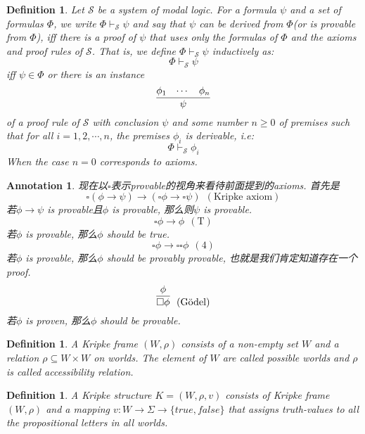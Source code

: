 \documentclass{article}
\theoremstyle{plain}
\newtheorem{definition}[theorem]{Definition}
\newtheorem{annotation}[theorem]{Annotation}
\newcounter{case}
\theoremstyle{nonumberplain}
\begin{document}
\begin{definition}
\rm Let $\mathcal{S}$ be a system of modal logic. For a formula $\psi$ and a set of formulas $\Phi$,  we write $\Phi \vdash_\mathcal{S} \psi$ and say that $\psi$ can be derived from $\Phi$(or is provable from $\Phi$), iff there is a proof of $\psi$ that uses only the formulas of $\Phi$ and the axioms and proof rules of $\mathcal{S}$. That is, we define $\Phi \vdash_\mathcal{S} \psi$ inductively as:
$$
\Phi \vdash_\mathcal{S} \psi
$$
iff $\psi \in \Phi$ or there is an instance
$$
\infer{\psi}{\phi_1 &  \cdots & \phi_n}
$$
of a proof rule of $\mathcal{S}$ with conclusion $\psi$ and some number $n \geq 0$ of premises such that for all $i=1,2,\cdots,n$, the premises $\phi_i$ is derivable, i.e:
$$
\Phi \vdash_\mathcal{S} \phi_i
$$
When the case $n=0$ corresponds to axioms. 
\end{definition}

\begin{annotation}
\rm 现在以$\square$表示provable的视角来看待前面提到的axioms. 首先是
$$
\square(\phi \to \psi) \to (\square\phi \to \square\psi)~~ (\text{Kripke axiom})
$$
若$\phi \to \psi$ is provable且$\phi$ is provable, 那么则$\psi$ is provable. 
$$
\square\phi \to \phi ~~(\text{T})
$$
若$\phi$ is provable, 那么$\phi$ should be true.
$$
\square\phi \to \square\square\phi ~~(4)
$$
若$\phi$ is provable, 那么$\phi$ should be provably provable, 也就是我们肯定知道存在一个proof. 
$$
\infer{\square \phi}{\phi} ~~(\text{G\"{o}del}) 
$$
若$\phi$ is proven, 那么$\phi$ should be provable. 
\end{annotation}


\begin{definition}
\rm A Kripke frame $(W,\rho)$ consists of a non-empty set $W$ and a relation $\rho \subseteq W \times W$ on worlds. The element of $W$ are called possible worlds and $\rho$ is called accessibility relation. 
\end{definition}

\begin{definition}
\rm A Kripke structure $K = (W, \rho, v)$ consists of Kripke frame $(W,\rho)$ and a mapping $v : W \to \Sigma \to \{true, false\}$ that assigns truth-values to all the propositional letters in all worlds.
\end{definition}
\end{document}
